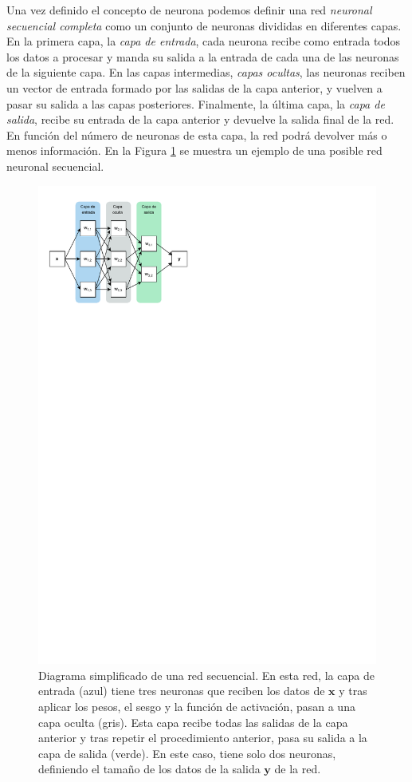 Una vez definido el concepto de neurona podemos definir una red \textit{neuronal secuencial completa} como un conjunto de neuronas divididas en diferentes capas. En la primera capa, la \textit{capa de entrada}, cada neurona recibe como entrada todos los datos a procesar y manda su salida a la entrada de cada una de las neuronas de la siguiente capa. En las capas intermedias, \textit{capas ocultas}, las neuronas reciben un vector de entrada formado por las salidas de la capa anterior, y vuelven a pasar su salida a las capas posteriores. Finalmente, la última capa, la \textit{capa de salida}, recibe su entrada de la capa anterior y devuelve la salida final de la red. En función del número de neuronas de esta capa, la red podrá devolver más o menos información. En la Figura \ref{fig:diagram-sec} se muestra un ejemplo de una posible red neuronal secuencial.

\begin{figure}[h]
  \centering
  \includegraphics{figures/diagram-secuential.pdf}
  \caption[Diagrama simplificado de una red secuencial.]{Diagrama simplificado de una red secuencial. En esta red, la capa de entrada (azul) tiene tres neuronas que reciben los datos de $ \mathbf{x} $ y tras aplicar los pesos, el sesgo y la función de activación, pasan a una capa oculta (gris). Esta capa recibe todas las salidas de la capa anterior y tras repetir el procedimiento anterior, pasa su salida a la capa de salida (verde). En este caso, tiene solo dos neuronas, definiendo el tamaño de los datos de la salida $ \mathbf{y} $ de la red.}
  \label{fig:diagram-sec}
\end{figure}

